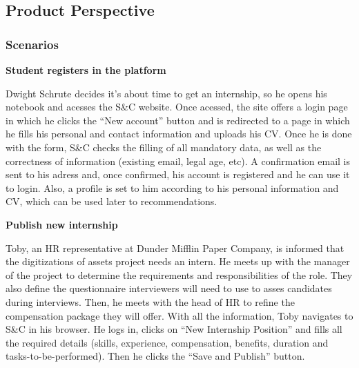 



\subsection{Product Perspective}
\subsubsection{Scenarios}

\textbf{Student registers in the platform}

Dwight Schrute decides it's about time to get an internship, so he opens his notebook and acesses the S\&C website. Once acessed, the site offers a login page in which he clicks the ``New account'' button and is redirected to a page in which he fills his personal and contact information and uploads his CV. Once he is done with the form, S\&C checks the filling of all mandatory data, as well as the correctness of information (existing email, legal age, etc). A confirmation email is sent to his adress and, once confirmed, his account is registered and he can use it to login. Also, a profile is set to him according to his personal information and CV, which can be used later to recommendations.


\textbf{Publish new internship}

Toby, an HR representative at Dunder Mifflin Paper Company, is informed that the digitizations of assets project needs an intern. He meets up with the manager of the project to determine the requirements and responsibilities of the role. They also define the questionnaire interviewers will need to use to asses candidates during interviews. Then, he meets with the head of HR to refine the compensation package they will offer. With all the information, Toby navigates to S\&C in his browser. He logs in, clicks on ``New Internship Position'' and fills all the required details (skills, experience, compensation, benefits, duration and tasks-to-be-performed). Then he clicks the ``Save and Publish'' button. 

